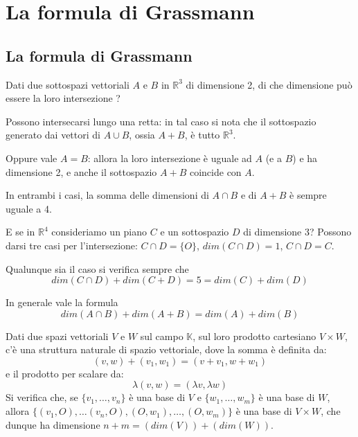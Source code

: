 \chapter{La formula di Grassmann}
\section{La formula di Grassmann}

Dati due sottospazi vettoriali $A$ e $B$ in $\mathbb{R}^3$ di dimensione 2,
di che dimensione pu\`o essere la loro intersezione ?

Possono intersecarsi lungo una retta: in tal caso si nota che il sottospazio
generato dai vettori di $A \cup B$, ossia $A + B$, \`e tutto $\mathbb{R}^3$.

Oppure vale $A = B$: allora la loro intersezione \`e uguale ad $A$ (e a $B$) e
ha dimensione 2, e anche il sottospazio $A + B$ coincide con $A$.

In entrambi i casi, la somma delle dimensioni di $A \cap B$ e di $A + B$ \`e
sempre uguale a 4.

E se in $\mathbb{R}^4$ consideriamo un piano $C$ e un sottospazio $D$ di
dimensione 3?
Possono darsi tre casi per l'intersezione: $C \cap D = \{O\}$,
$dim(C \cap D) = 1$, $C \cap D = C$.

Qualunque sia il caso si verifica sempre che
\begin{equation*}
	dim(C \cap D) + dim(C + D) = 5 = dim(C) + dim(D)
\end{equation*}

In generale vale la formula
\begin{equation*}
	dim(A \cap B) + dim(A + B) = dim(A) + dim(B)
\end{equation*}

Dati due spazi vettoriali $V$ e $W$ sul campo $\mathbb{K}$, sul loro prodotto
cartesiano $V \times W$, c'\`e una struttura naturale di spazio vettoriale, dove
la somma \`e definita da:
\begin{equation*}
	(v, w) + (v_1, w_1) = (v + v_1, w + w_1)
\end{equation*}
e il prodotto per scalare da:
\begin{equation*}
	\lambda(v, w) = (\lambda v, \lambda w)
\end{equation*}
Si verifica che, se $\{v_1, \dots, v_n\}$ \`e una base di $V$
e $\{w_1, \dots, w_m\}$ \`e una base di $W$, allora
$\{(v_1, O), \dots (v_n, O), (O, w_1), \dots, (O, w_m)\}$ \`e una base di
$V \times W$, che dunque ha dimensione $n + m = (dim(V)) + (dim(W))$.

